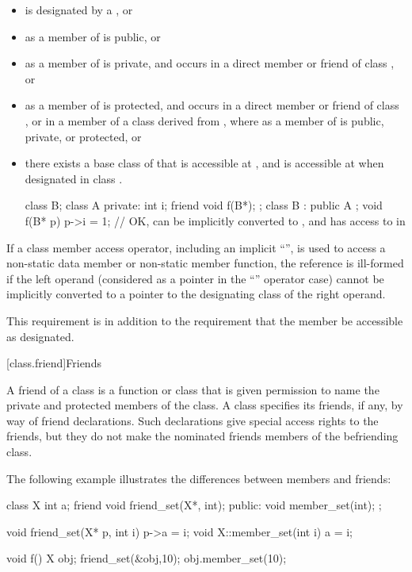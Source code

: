\begin{itemize}
\item
{} is designated by a , or
\item
{}
as a member of
is public, or
\item
{}
as a member of
is private, and
occurs in a direct member or friend of class
,
or
\item
{}
as a member of
is protected, and
occurs in a direct member or friend of class
,
or in a member of a class
derived from
,
where
as a member of
is public, private, or protected, or
\item
there exists a base class
of
that is accessible at
,
and
is accessible at
when designated in class
.
\begin{example}
\begin{codeblock}
class B;
class A {
private:
  int i;
  friend void f(B*);
};
class B : public A { };
void f(B* p) {
  p->i = 1;         // OK,  can be implicitly converted to , and  has access to  in 
}
\end{codeblock}
\end{example}
\end{itemize}

\pnum
If a class member access operator, including an implicit
``'',
is used to access a non-static data member or non-static
member function, the reference is ill-formed if the
left operand (considered as a pointer in the
``''
operator case) cannot be implicitly converted to a
pointer to the designating class of the right operand.
\begin{note}
This requirement is in addition to the requirement that
the member be accessible as designated.
\end{note}

[class.friend]{Friends}%
%

\pnum
A friend of a class is a function or class that is
given permission to name the private and protected members of the class.
A class specifies its friends, if any, by way of friend declarations.
Such declarations give special access rights to the friends, but they
do not make the nominated friends members of the befriending class.
\begin{example}
The following example illustrates the differences between
members and friends:
%

\begin{codeblock}
class X {
  int a;
  friend void friend_set(X*, int);
public:
  void member_set(int);
};

void friend_set(X* p, int i) { p->a = i; }
void X::member_set(int i) { a = i; }

void f() {
  X obj;
  friend_set(&obj,10);
  obj.member_set(10);
}
\end{codeblock}
\end{example}

